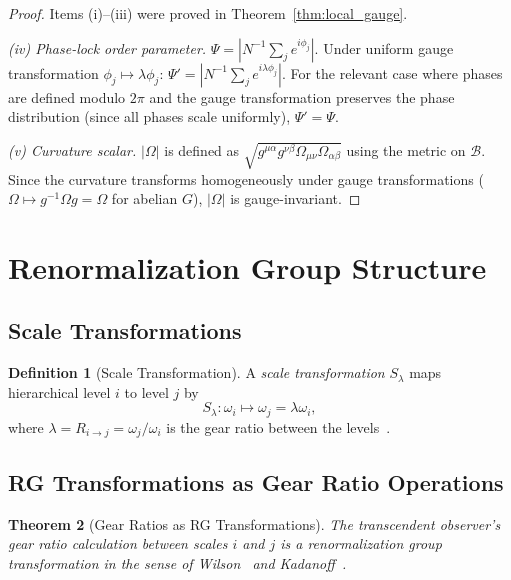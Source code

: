 \documentclass[11pt,twocolumn,a4paper]{article}
\newtheorem{theorem}{Theorem}[section]
\theoremstyle{definition}
\newtheorem{definition}[theorem]{Definition}
\newcommand{\Bsp}{\mathcal{B}}
\newcommand{\Rij}{R_{i \to j}}
\begin{document}
\begin{proof}
Items (i)--(iii) were proved in Theorem~\ref{thm:local_gauge}.

\emph{(iv) Phase-lock order parameter.}
$\Psi = |N^{-1}\sum_j e^{i\phi_j}|$. Under uniform gauge transformation
$\phi_j \mapsto \lambda\phi_j$:
$\Psi' = |N^{-1}\sum_j e^{i\lambda\phi_j}|$. For the relevant case where phases
are defined modulo $2\pi$ and the gauge transformation preserves the phase distribution
(since all phases scale uniformly), $\Psi' = \Psi$.

\emph{(v) Curvature scalar.}
$|\Omega|$ is defined as $\sqrt{g^{\mu\alpha}g^{\nu\beta}\Omega_{\mu\nu}\Omega_{\alpha\beta}}$
using the metric on $\Bsp$. Since the curvature transforms homogeneously under gauge
transformations ($\Omega \mapsto g^{-1}\Omega g = \Omega$ for abelian $G$), $|\Omega|$
is gauge-invariant.
\end{proof}


\section{Renormalization Group Structure}\label{sec:rg}

\subsection{Scale Transformations}\label{sec:rg:scale}

\begin{definition}[Scale Transformation]\label{def:scale_transform}
A \emph{scale transformation} $S_\lambda$ maps hierarchical level $i$ to level $j$ by
\begin{equation}\label{eq:scale_transform}
  S_\lambda: \omega_i \mapsto \omega_j = \lambda \omega_i,
\end{equation}
where $\lambda = \Rij = \omega_j/\omega_i$ is the gear ratio between the
levels~\cite{wilson1971,kadanoff1966}.
\end{definition}

\subsection{RG Transformations as Gear Ratio Operations}\label{sec:rg:rg_gear}

\begin{theorem}[Gear Ratios as RG Transformations]\label{thm:rg_gear}
The transcendent observer's gear ratio calculation between scales $i$ and $j$ is a
renormalization group transformation in the sense of Wilson~\cite{wilson1971} and
Kadanoff~\cite{kadanoff1966}.
\end{theorem}
\end{document}
